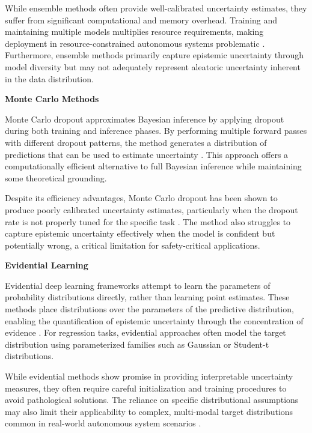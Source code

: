 While ensemble methods often provide well-calibrated uncertainty estimates, they suffer from significant computational and memory overhead. Training and maintaining multiple models multiplies resource requirements, making deployment in resource-constrained autonomous systems problematic \cite{malinin2020regression}. Furthermore, ensemble methods primarily capture epistemic uncertainty through model diversity but may not adequately represent aleatoric uncertainty inherent in the data distribution.

\textbf{Monte Carlo Methods}

Monte Carlo dropout approximates Bayesian inference by applying dropout during both training and inference phases. By performing multiple forward passes with different dropout patterns, the method generates a distribution of predictions that can be used to estimate uncertainty \cite{wibbeke2025evaluating}. This approach offers a computationally efficient alternative to full Bayesian inference while maintaining some theoretical grounding.

Despite its efficiency advantages, Monte Carlo dropout has been shown to produce poorly calibrated uncertainty estimates, particularly when the dropout rate is not properly tuned for the specific task \cite{gawlikowski2021survey}. The method also struggles to capture epistemic uncertainty effectively when the model is confident but potentially wrong, a critical limitation for safety-critical applications.

\textbf{Evidential Learning}

Evidential deep learning frameworks attempt to learn the parameters of probability distributions directly, rather than learning point estimates. These methods place distributions over the parameters of the predictive distribution, enabling the quantification of epistemic uncertainty through the concentration of evidence \cite{malinin2020regression}. For regression tasks, evidential approaches often model the target distribution using parameterized families such as Gaussian or Student-t distributions.

While evidential methods show promise in providing interpretable uncertainty measures, they often require careful initialization and training procedures to avoid pathological solutions. The reliance on specific distributional assumptions may also limit their applicability to complex, multi-modal target distributions common in real-world autonomous system scenarios \cite{bigi2024prediction}.



